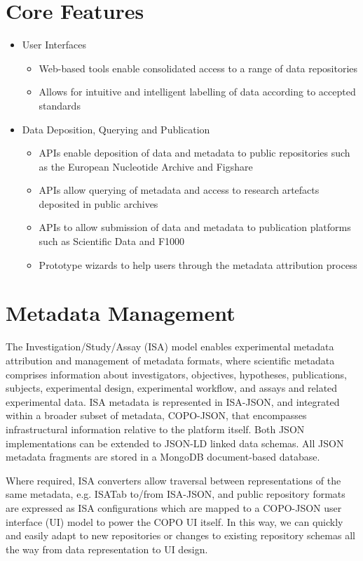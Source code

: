 \documentclass[runningheads,a4paper]{llncs}
\begin{document}
\section{Core Features}
\begin{itemize}
\item User Interfaces
  \begin{itemize}
  \item Web-based tools enable consolidated access to a range of data
    repositories
  \item Allows for intuitive and intelligent labelling of data
    according to accepted standards
  \end{itemize}
\item Data Deposition, Querying and Publication
  \begin{itemize}
  \item APIs enable deposition of data and metadata to public
    repositories such as the European Nucleotide Archive and Figshare
  \item APIs allow querying of metadata and access to research
    artefacts deposited in public archives
  \item APIs to allow submission of data and metadata to publication
    platforms such as Scientific Data and F1000
  \item Prototype wizards to help users through the metadata
    attribution process
  \end{itemize}
\end{itemize}

\vspace*{-0.3in}
\section{Metadata Management}
The Investigation/Study/Assay (ISA) model enables experimental
metadata attribution and management of metadata formats, where
scientific metadata comprises information about investigators,
objectives, hypotheses, publications, subjects, experimental design,
experimental workflow, and assays and related experimental data. ISA
metadata is represented in ISA-JSON, and integrated within a broader
subset of metadata, COPO-JSON, that encompasses infrastructural
information relative to the platform itself. Both JSON implementations
can be extended to JSON-LD linked data schemas. All JSON metadata
fragments are stored in a MongoDB document-based database.

Where required, ISA converters allow traversal between representations
of the same metadata, e.g. ISATab to/from ISA-JSON, and public
repository formats are expressed as ISA configurations which are
mapped to a COPO-JSON user interface (UI) model to power the COPO UI
itself. In this way, we can quickly and easily adapt to new
repositories or changes to existing repository schemas all the way
from data representation to UI design.
\end{document}

